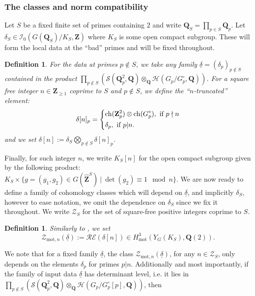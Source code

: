 \documentclass{amsart}%
\theoremstyle{plain}
\theoremstyle{plain}
\newtheorem{defn}[thm]{Definition}
\theoremstyle{remark}
\DeclareMathOperator{\ch}{ch}
\begin{document}
\subsubsection{The classes and norm compatibility}\label{sec classes and norm relatiosn}

 Let $S$ be a fixed finite set of primes containing $2$ and write $\mathbf{Q}_S=\prod_{p\in S} \mathbf{Q}_p$. Let $\delta_S\in \mathcal{I}_0(G(\mathbf{Q}_S)/K_S,\mathbf{Z})$ where $K_S$ is some open compact subgroup. These will form the local data at the ``bad'' primes and will be fixed throughout. 
 \begin{defn}For the data at primes $p\notin S$, we take any family $\underline{\delta}=(\delta_p)_{p\notin S}$ contained in the product $ \prod_{p\notin S}\left(\mathcal{S}(\mathbf{Q}_p^2,\mathbf{Q})\otimes_\mathbf{Q} \mathcal{H}(G_p/G_p^\circ,\mathbf{Q})\right)$.
For a square free integer $n\in\mathbf{Z}_{\geq 1}$ coprime to $S$ and $p\notin S$, we define the ``$n$-truncated'' element:
$$\delta[n]_p=\begin{dcases}
    \ch(\mathbf{Z}_p^2)\otimes \ch(G_p^\circ),\ \text{if}\ p\nmid n\\
    \delta_p,\ \text{if}\ p|n.
\end{dcases}$$
and we set $\delta[n]:=\delta_S\bigotimes_{p\notin S}\delta[n]_p$.
\end{defn}
\noindent Finally, for such integer $n$, we write $K_S[n]$ for the open compact subgroup given by the following product: $K_S\times\{g=(g_1,g_2)\in G(\hat{\mathbf{Z}}^S)\ |\ \det(g_2)\equiv 1\mod n\}$. We are now ready to define a family of cohomology classes which will depend on $\underline{\delta}$, and implicitly $\delta_S$, however to ease notation, we omit the dependence on $\delta_S$ since we fix it throughout. We write $\mathscr{Z}_S$ for the set of square-free positive integers coprime to $S$.
\begin{defn}\label{def classes}
    Similarly to \emph{\cite{Loeffler_2021}}, we set $$\mathcal{Z}_{\mathrm{mot},n}(\underline{\delta}):=\mathcal{RE}(\delta[n])\in H^3_\mathrm{mot}(Y_G(K_S),\mathbf{Q}(2)).$$
\end{defn}
\noindent We note that for a fixed family $\underline{\delta}$, the class $\mathcal{Z}_{\mathrm{
mot},n}(\underline{\delta})$, for any $n\in\mathscr{Z}_S$, only depends on the elements $\delta_p$ for primes $p|n$. Additionally and most importantly, if the family of input data $\underline{\delta}$ has determinant level, i.e. it lies in $\prod_{p\notin S}\left(\mathcal{S}(\mathbf{Q}_p^2,\mathbf{Q})\otimes_\mathbf{Q} \mathcal{H}(G_p/G_p^\circ[p],\mathbf{Q})\right)$, then
\end{document}
